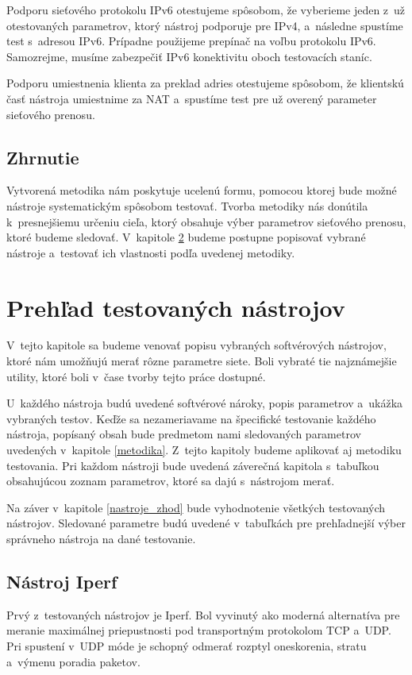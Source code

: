 Podporu sieťového protokolu IPv6 otestujeme spôsobom, že vyberieme jeden
z~už otestovaných parametrov, ktorý nástroj podporuje pre IPv4, a~následne
spustíme test s~adresou IPv6. Prípadne použijeme prepínač na voľbu protokolu IPv6.
Samozrejme, musíme zabezpečiť IPv6 konektivitu oboch testovacích staníc.

Podporu umiestnenia klienta za preklad adries otestujeme
spôsobom, že klientskú časť nástroja umiestnime za NAT a~spustíme test pre
už overený parameter sieťového prenosu.

\section{Zhrnutie}
Vytvorená metodika nám poskytuje ucelenú formu, pomocou ktorej bude možné nástroje
systematickým spôsobom testovať. Tvorba metodiky nás donútila
k~presnejšiemu určeniu cieľa, ktorý obsahuje výber parametrov 
sieťového prenosu, ktoré budeme sledovať.
V~kapitole \ref{nastroje} budeme postupne
popisovať vybrané nástroje a~testovať ich vlastnosti podľa uvedenej metodiky.

\chapter{Prehľad testovaných nástrojov} \label{nastroje}
V~tejto kapitole sa budeme venovať popisu vybraných softvérových nástrojov,
ktoré nám umožňujú merať rôzne parametre siete. Boli vybraté tie najznámejšie
utility, ktoré boli v~čase tvorby tejto práce dostupné.

U~každého nástroja budú uvedené softvérové nároky, popis 
parametrov a~ukážka vybraných testov. Keďže sa nezameriavame na 
špecifické testovanie každého nástroja, popísaný obsah bude predmetom
nami sledovaných parametrov uvedených v~kapitole \ref{metodika}. Z~tejto
kapitoly budeme aplikovať aj metodiku testovania. Pri každom nástroji
bude uvedená záverečná kapitola s~tabuľkou obsahujúcou zoznam parametrov, 
ktoré sa dajú s~nástrojom merať.

Na záver v~kapitole \ref{nastroje_zhod} bude vyhodnotenie všetkých testovaných
nástrojov. Sledované parametre budú uvedené v~tabuľkách pre prehľadnejší výber
správneho nástroja na dané testovanie.

\section{Nástroj Iperf} \label{iperf}
    Prvý z~testovaných nástrojov je Iperf. Bol vyvinutý ako moderná
    alternatíva pre meranie maximálnej priepustnosti pod transportným 
    protokolom TCP a~UDP.
    Pri spustení v~UDP móde je schopný odmerať rozptyl oneskorenia, stratu
    a~výmenu poradia paketov.
    
